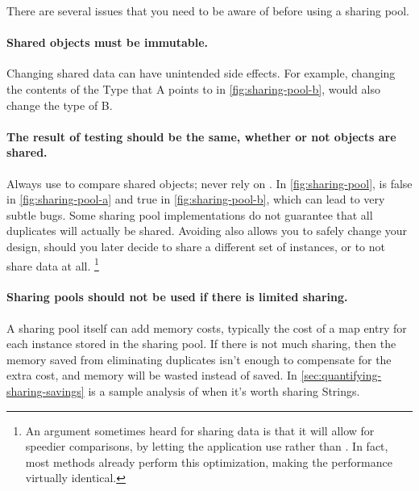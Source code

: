 There are several issues that you need to be aware of before using a sharing
pool.
\paragraph{Shared objects must be immutable.} Changing shared data can
have unintended side effects. For example, 
changing the contents of the Type that A points to in
\autoref{fig:sharing-pool-b}, would also change the type of B.

\paragraph{The result of  testing should be the same,
whether or not objects are shared.}
Always use  to compare shared objects; never rely on \code{==}.
In \autoref{fig:sharing-pool},
 is false in \ref{fig:sharing-pool-a} and true in
\ref{fig:sharing-pool-b}, which can lead to very subtle bugs.
Some sharing pool implementations do not guarantee that all
duplicates will actually be shared. Avoiding \code{==} also allows
you to safely change your design, should you later decide to share a different set of instances, or to not share data at all.
\footnote{An argument sometimes heard for sharing data is that it will
allow for speedier comparisons, by letting the application use \code{==} rather
than . In fact, most
  methods already perform this optimization, making the performance virtually identical.}
 
\paragraph{Sharing pools should not be used if there is limited sharing.}
A sharing pool itself can add
memory costs, typically the cost of a map entry for each instance stored in the
sharing pool.
If there is not much sharing, then the memory saved from
eliminating duplicates isn't enough to compensate for the
extra cost, and memory will be wasted instead of saved.  In \autoref{sec:quantifying-sharing-savings} is
a sample analysis of when it's worth sharing Strings.


